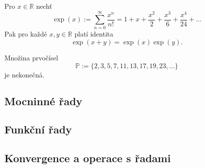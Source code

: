 \documentclass[../main.tex]{subfiles}
\begin{document}
\begin{lemma}[Exponenciála]
    Pro $x\in \mathbb{R}$ nechť \[ \exp(x) := \sum_{n=0}^{\infty} \frac{x^n}{n!} = 1 + x + \frac{x^2}{2} + \frac{x^3}{6} + \frac{x^4}{24} + \dots \]
    Pak pro každé $x,y \in \mathbb{R}$ platí identita \[ \exp(x+y) = \exp(x)\exp(y). \]
\end{lemma}

\begin{lemma}
    Množina prvočísel
    \[ \mathbb{P} := \{ 2,3,5,7,11,13,17,19,23, \dots \} \]
    je nekonečná.
\end{lemma}

\subsection{Mocninné řady}
\subsection{Funkční řady}
\subsection{Konvergence a operace s řadami}
\end{document}
